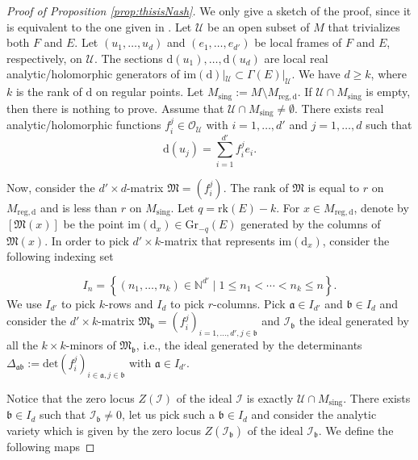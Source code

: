 \documentclass[10pt]{article}
\theoremstyle{plain}
\theoremstyle{definition}
\theoremstyle{remark}
\newcommand{\dd}{\mathrm{d}}
\begin{document}
\begin{proof}[Proof of Proposition \ref{prop:thisisNash}]
We only give a sketch of the proof, since it is equivalent to the one given in 
\cite{Nobile,Ali-Sinan}. Let $\mathcal{U}$ be an open subset of $M$ that trivializes both $F$ and $E$. Let $(u_1, \ldots, u_d)$ and $(e_1, \ldots, e_{d'})$ be local frames of $F$ and $E$, respectively, on $\mathcal{U}$. The sections $\dd(u_1),\ldots,\dd(u_d)$ are local real analytic/holomorphic generators of $\mathrm{im}(\dd)|_\mathcal{U}\subset \Gamma(E)|_\mathcal{U}$. We have $d\geq k$, where $k$ is the rank of $\dd$ on regular points. Let $M_{\mathrm{sing}}:=M\setminus M_{\mathrm{reg},\dd}$. If $\mathcal{U}\cap M_{\mathrm{sing}}$ is empty, then there is nothing to prove. Assume that $\mathcal{U}\cap M_{\mathrm{sing}}\neq \emptyset$. There exists real analytic/holomorphic functions $f_i^j\in\mathcal{O}_\mathcal U$ with $i=1,\ldots,d'$ and $j=1,\ldots,d$ such that $$\displaystyle{
\dd(u_j)=\sum_{i=1}^{d'}f_i^je_i}.$$
    
Now, consider the $d'\times d$-matrix $\mathfrak M=(f_i^j)$. The rank of $\mathfrak M$ is equal to  $r$ on $M_{\mathrm{reg},\dd}$ and is less than $r$  on $M_\mathrm{sing}$. Let $q=\mathrm{rk}(E)-k$. For $x\in M_{\mathrm{reg},\dd}$, denote by  $[\mathfrak M (x)]$ be the point $\mathrm{im}(\dd_x)\in \mathrm{Gr}_{-q}(E)$ generated by the columns of $\mathfrak{M}(x)$. In order to pick $d'\times k$-matrix that represents $\mathrm{im}(\dd_x)$,  consider the following indexing set

$$I_n=\left\{(n_1,\ldots,n_k)\in \mathbb N^{d'}\mid 1\leq n_1<\cdots<n_k\leq n\right\}.$$ We use $I_{d'}$ to pick $k$-rows and $I_d$ to pick $r$-columns. Pick  $\mathfrak a\in I_{d'}$ and $\mathfrak b\in I_d$ and consider the $d'\times k$-matrix $\mathfrak M_\mathfrak b=(f_i^j)_{i=1,\ldots, d', j\in \mathfrak b}$ and $\mathcal{I}_\mathfrak b$ the ideal generated by all the $k\times k$-minors of $\mathfrak M_ \mathfrak b$, i.e., the ideal generated by the  determinants $\Delta_{\mathfrak a \mathfrak b}:=\mathrm{det}(f_i^j)_{i\in \mathfrak a,j\in\mathfrak b }$ with $\mathfrak a\in I_{d'}$.
    \item [] 

Notice that the zero locus $Z(\mathcal I)$ of the ideal $\mathcal I$ is exactly $\mathcal{U}\cap M_{\mathrm{sing}}$. There exists $\mathfrak b\in I_d$ such that $\mathcal{I}_\mathfrak b\neq 0$, let us pick such a $\mathfrak b\in I_d$ and consider the analytic variety which is given by  the zero locus $Z(\mathcal{I}_\mathfrak b)$ of the ideal $\mathcal{I}_\mathfrak b$. We define the following maps


\end{proof}
\end{document}
